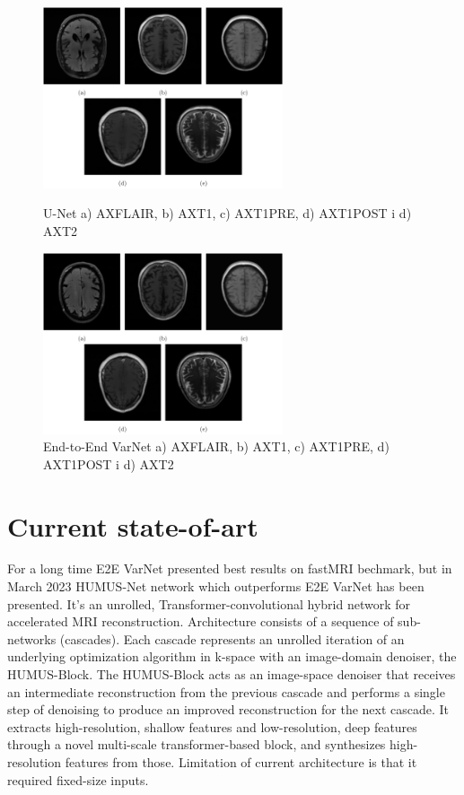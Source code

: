 \documentclass[10pt,a4paper]{article}
\begin{document}
\begin{figure}[H]
\begin{minipage}{.45\textwidth}
  \centering
  \includegraphics[width=200pt]{./images/unet-images.png}
  \caption{U-Net a) AXFLAIR, b) AXT1, c) AXT1PRE, d) AXT1POST i d) AXT2}
\end{minipage}%
\hspace{20pt} %
\begin{minipage}{.45\textwidth}
  \centering
  \includegraphics[width=200pt]{./images/varnet-images.png}
  \caption{End-to-End VarNet a) AXFLAIR, b) AXT1, c) AXT1PRE, d) AXT1POST i d) AXT2}
\end{minipage}
\end{figure}

\newpage

\section{Current state-of-art}

For a long time E2E VarNet presented best results on fastMRI bechmark, but in March 2023 HUMUS-Net network which outperforms E2E VarNet has been presented. It's an unrolled, Transformer-convolutional hybrid network for accelerated MRI reconstruction. Architecture consists of a sequence of sub-networks (cascades). Each cascade represents an unrolled iteration of an underlying optimization algorithm in k-space with an image-domain denoiser, the HUMUS-Block. The HUMUS-Block acts as an image-space denoiser that receives an intermediate reconstruction from the previous cascade and performs a single step of denoising to produce an improved reconstruction for the next cascade. It extracts high-resolution, shallow features and low-resolution, deep features through a novel multi-scale transformer-based block, and synthesizes high-resolution features from those. Limitation of current architecture is that it required fixed-size inputs.
\end{document}
